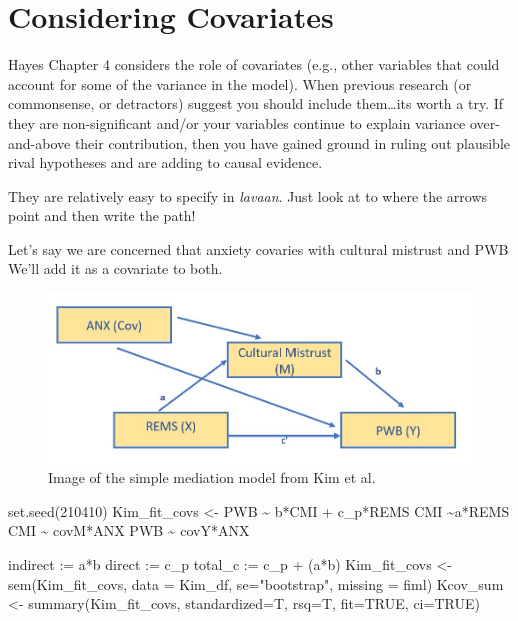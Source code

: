 \documentclass[
]{book}
\newenvironment{Shaded}{\begin{snugshade}}{\end{snugshade}}
\newcommand{\AttributeTok}[1]{\textcolor[rgb]{0.77,0.63,0.00}{#1}}
\newcommand{\ConstantTok}[1]{\textcolor[rgb]{0.00,0.00,0.00}{#1}}
\newcommand{\DecValTok}[1]{\textcolor[rgb]{0.00,0.00,0.81}{#1}}
\newcommand{\FunctionTok}[1]{\textcolor[rgb]{0.00,0.00,0.00}{#1}}
\newcommand{\NormalTok}[1]{#1}
\newcommand{\OtherTok}[1]{\textcolor[rgb]{0.56,0.35,0.01}{#1}}
\newcommand{\StringTok}[1]{\textcolor[rgb]{0.31,0.60,0.02}{#1}}
\begin{document}
\hypertarget{considering-covariates}{%
\section{Considering Covariates}\label{considering-covariates}}

Hayes Chapter 4 \citeyearpar{hayes_introduction_2018} considers the role of covariates (e.g., other variables that could account for some of the variance in the model). When previous research (or commonsense, or detractors) suggest you should include them\ldots its worth a try. If they are non-significant and/or your variables continue to explain variance over-and-above their contribution, then you have gained ground in ruling out plausible rival hypotheses and are adding to causal evidence.

They are relatively easy to specify in \emph{lavaan}. Just look at to where the arrows point and then write the path!

Let's say we are concerned that anxiety covaries with cultural mistrust and PWB We'll add it as a covariate to both.

\begin{figure}
\centering
\includegraphics{images/SimpleMed/Kim_wCovs.jpg}
\caption{Image of the simple mediation model from Kim et al.}
\end{figure}

\begin{Shaded}
\begin{Highlighting}[]
\FunctionTok{set.seed}\NormalTok{(}\DecValTok{210410}\NormalTok{)}
\NormalTok{Kim\_fit\_covs }\OtherTok{\textless{}{-}} \StringTok{\textquotesingle{}}
\StringTok{          PWB \textasciitilde{} b*CMI + c\_p*REMS }
\StringTok{          CMI \textasciitilde{}a*REMS}
\StringTok{          CMI \textasciitilde{} covM*ANX}
\StringTok{          PWB \textasciitilde{} covY*ANX}

\StringTok{          indirect :=  a*b}
\StringTok{          direct  := c\_p}
\StringTok{          total\_c  := c\_p + (a*b)}
\StringTok{          \textquotesingle{}}
\NormalTok{Kim\_fit\_covs }\OtherTok{\textless{}{-}} \FunctionTok{sem}\NormalTok{(Kim\_fit\_covs, }\AttributeTok{data =}\NormalTok{ Kim\_df, }\AttributeTok{se=}\StringTok{"bootstrap"}\NormalTok{, }\AttributeTok{missing =} \StringTok{\textquotesingle{}fiml\textquotesingle{}}\NormalTok{)}
\NormalTok{Kcov\_sum }\OtherTok{\textless{}{-}} \FunctionTok{summary}\NormalTok{(Kim\_fit\_covs, }\AttributeTok{standardized=}\NormalTok{T, }\AttributeTok{rsq=}\NormalTok{T, }\AttributeTok{fit=}\ConstantTok{TRUE}\NormalTok{, }\AttributeTok{ci=}\ConstantTok{TRUE}\NormalTok{)}
\end{Highlighting}
\end{Shaded}
\end{document}
